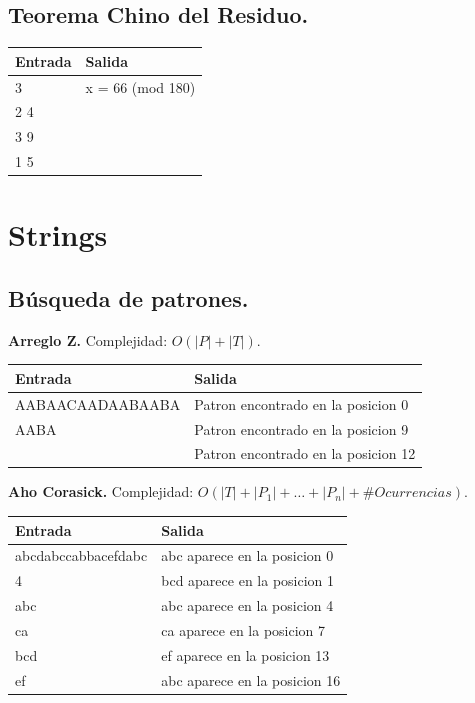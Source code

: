 \documentclass[10pt, letterpaper, twoside]{article}
\begin{document}
\subsection{Teorema Chino del Residuo.}



\begin{tabular}{|p{7cm}|p{7cm}|}
\hline
\textbf{Entrada} & \textbf{Salida}\\ \hline
3   & x = 66 (mod 180)\\
2 4 & \\ 
3 9 & \\ 
1 5 & \\ \hline
\end{tabular}

\newpage

\section{Strings}

\subsection{Búsqueda de patrones.}

\textbf{Arreglo Z.} Complejidad: $O(|P| + |T|)$.



\begin{tabular}{|p{7cm}|p{7cm}|}
\hline
\textbf{Entrada} & \textbf{Salida}\\ \hline
AABAACAADAABAABA & Patron encontrado en la posicion 0\\
AABA             & Patron encontrado en la posicion 9\\
                 & Patron encontrado en la posicion 12\\ \hline
\end{tabular}\bigskip

\textbf{Aho Corasick.} Complejidad: $O(|T| + |P_1| + \ldots + |P_n| + \#Ocurrencias)$.



\begin{tabular}{|p{7cm}|p{7cm}|}
\hline
\textbf{Entrada} & \textbf{Salida}\\ \hline
abcdabccabbacefdabc & abc aparece en la posicion 0\\
4                   & bcd aparece en la posicion 1\\
abc                 & abc aparece en la posicion 4\\
ca                  & ca aparece en la posicion 7\\
bcd                 & ef aparece en la posicion 13\\
ef                  & abc aparece en la posicion 16\\ \hline
\end{tabular}
\end{document}
